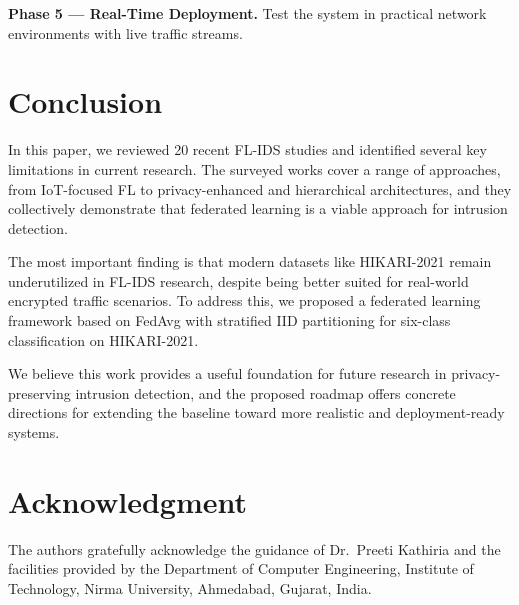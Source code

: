 \documentclass[conference]{IEEEtran}
\begin{document}
\textbf{Phase 5 --- Real-Time Deployment.} Test the system in practical network environments with live traffic streams.


\section{Conclusion}
\label{sec:conclusion}

In this paper, we reviewed 20 recent FL-IDS studies and identified several key limitations in current research. The surveyed works cover a range of approaches, from IoT-focused FL to privacy-enhanced and hierarchical architectures, and they collectively demonstrate that federated learning is a viable approach for intrusion detection.

The most important finding is that modern datasets like HIKARI-2021 remain underutilized in FL-IDS research, despite being better suited for real-world encrypted traffic scenarios. To address this, we proposed a federated learning framework based on FedAvg with stratified IID partitioning for six-class classification on HIKARI-2021.

We believe this work provides a useful foundation for future research in privacy-preserving intrusion detection, and the proposed roadmap offers concrete directions for extending the baseline toward more realistic and deployment-ready systems.

\section*{Acknowledgment}
The authors gratefully acknowledge the guidance of Dr.\ Preeti Kathiria and the facilities provided by the Department of Computer Engineering, Institute of Technology, Nirma University, Ahmedabad, Gujarat, India.



\end{document}
